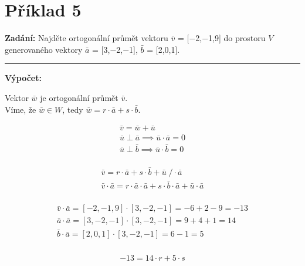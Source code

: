 \section{Příklad 5}

\textbf{Zadání:} Najděte ortogonální průmět vektoru $\bar{v}$ = [$\minus$2,$\minus$1,9] do prostoru $V$ generovaného vektory $\bar{a}$ = [3,$\minus$2,$\minus$1], $\bar{b}$ = [2,0,1].
\par\noindent\rule{\textwidth}{0.4pt}

\textbf{Výpočet:}
\begin{center}
Vektor $\bar{w}$ je ortogonální průmět $\bar{v}$.\\
Víme, že $\bar{w} \in W$, tedy $\bar{w} = r\cdot\bar{a}+s\cdot\bar{b}$.
\end{center}

\begin{displaymath}
\begin{matrix}
\bar{v} = \bar{w} + \bar{u} \\
\bar{u} \perp \bar{a} \implies \bar{u} \cdot \bar{a} = 0\\
\bar{u} \perp \bar{b} \implies \bar{u} \cdot \bar{b} = 0\\
\end{matrix}
\end{displaymath}

\begin{displaymath}
\begin{matrix}
\bar{v} = r\cdot\bar{a}+s\cdot\bar{b} + \bar{u} \; / \cdot \bar{a}\\
\bar{v}\cdot\bar{a} = r\cdot\bar{a}\cdot\bar{a} + s\cdot\bar{b}\cdot\bar{a} + \bar{u}\cdot\bar{a}\\
\end{matrix}
\end{displaymath}

\begin{displaymath}
\begin{matrix}
\bar{v}\cdot\bar{a} = [\minus2,\minus1,9]\cdot[3,\minus2,\minus1]=\minus6+2-9=\minus13\\
\bar{a}\cdot\bar{a} = [3,\minus2,\minus1]\cdot[3,\minus2,\minus1]=9+4+1=14\\
\bar{b}\cdot\bar{a} = [2,0,1]\cdot[3,\minus2,\minus1]=6\minus1=5\\
\end{matrix}
\end{displaymath}

\begin{displaymath}
\begin{matrix}
-13=14\cdot r+5\cdot s\\
\end{matrix}
\end{displaymath}

